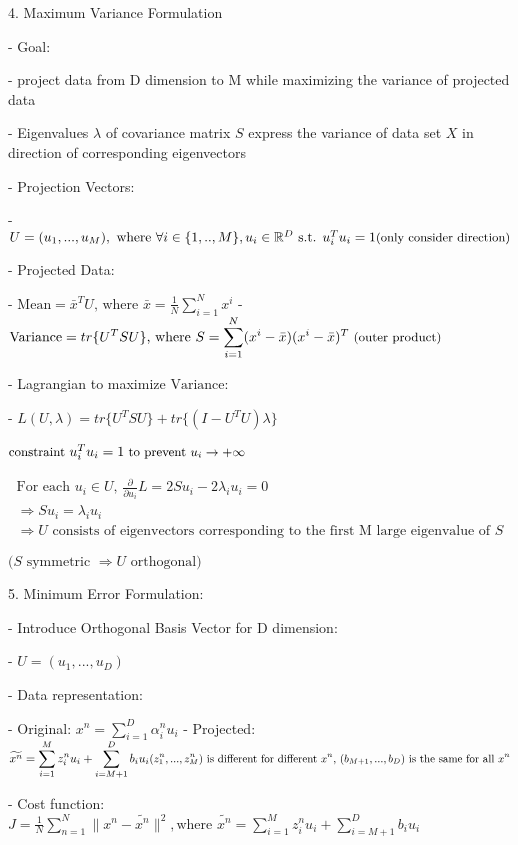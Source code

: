 4. Maximum Variance Formulation

- Goal: 

- project data from D dimension to M while maximizing the variance of projected data

- Eigenvalues $\lambda$ of covariance matrix $S$ express the variance of data set $X$ in direction of corresponding eigenvectors

- Projection Vectors: 

- $U = (u_1,...,u_M), \text{ where } \forall i\in\{1,..,M\},u_i \in \mathbb R^D \text{ s.t. } u_i^Tu_i=1 \space \small \text{(only consider direction)} $ 

- Projected Data:

- $\displaystyle \text{Mean} = {\bar x}^TU \text{, where } \bar x = \frac 1 N\sum_{i=1}^Nx^i$ 
- $\displaystyle \text{Variance} =  tr\{U^T S U\} \text{, where } S = \sum_{i=1}^N(x^i-\bar x)(x^i-\bar x)^T \space\small\text{ (outer product)}$ 

- Lagrangian to maximize $\text{Variance}$: 

- $\displaystyle L(U,\lambda)=tr\{U^TSU\}+tr\{(I-U^TU)\lambda\}$ 

	$\small\text{constraint }u_i^Tu_i=1 \text{ to prevent $u_i \rightarrow +\infty$ } $ 

\begin{gather}\text{For each $u_i\in U$, } \displaystyle \frac \partial {\partial u_i}L = 2Su_i-2\lambda_iu_i=0 \\ \Rightarrow Su_i=\lambda_iu_i \\ \Rightarrow \text{$U$ consists of eigenvectors corresponding to the first M large eigenvalue of $S$}\end{gather}

	\(\text{($S$ symmetric $\Rightarrow U$ orthogonal)}\)

5. Minimum Error Formulation:

- Introduce Orthogonal Basis Vector for D dimension:

- $U=(u_1,...,u_D)$ 

- Data representation:

- Original: $\displaystyle x^n = \sum_{i=1}^D\alpha^n_iu_i$ 
- Projected: \(\displaystyle \widetilde {x^n} = \sum_{i=1}^Mz_i^nu_i+\sum_{i=M+1}^Db_iu_i \\ \small\text{$(z_1^n,...,z_M^n)$ is different for different $x^n$, $(b_{M+1},...,b_D)$ is the same for all  $x^n$}\)

- Cost function: $\displaystyle J=\frac1N \sum^N_{n=1}\|x^n-\widetilde{x^n}\|^2, \text{where } \widetilde{x^n}=\sum_{i=1}^Mz^n_iu_i + \sum_{i=M+1}^Db_iu_i$ 

